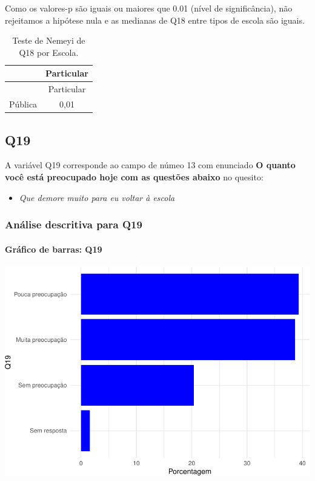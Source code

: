 \documentclass[]{article}
\providecommand{\tightlist}{%
  \setlength{\itemsep}{0pt}\setlength{\parskip}{0pt}}
\let\oldparagraph\paragraph
\renewcommand{\paragraph}[1]{\oldparagraph{#1}\mbox{}}
\begin{document}
Como os valores-p são iguais ou maiores que 0.01 (nível de significância), não rejeitamos a hipótese nula e as medianas de Q18 entre tipos de escola são iguais.

\begin{longtable}[]{@{}lc@{}}
\caption{\label{tab:unnamed-chunk-297}Teste de Nemeyi de Q18 por Escola.}\tabularnewline
\toprule
& Particular\tabularnewline
\midrule
\endfirsthead
\toprule
& Particular\tabularnewline
\midrule
\endhead
Pública & 0,01\tabularnewline
\bottomrule
\end{longtable}

\cleardoublepage

\hypertarget{q19}{%
\subsection{Q19}\label{q19}}

A variável Q19 corresponde ao campo de númeo 13 com enunciado \textbf{O quanto você está preocupado hoje com as questões abaixo} no quesito:

\begin{itemize}
\tightlist
\item
  \emph{Que demore muito para eu voltar à escola}
\end{itemize}

\hypertarget{anuxe1lise-descritiva-para-q19}{%
\subsubsection{Análise descritiva para Q19}\label{anuxe1lise-descritiva-para-q19}}

\hypertarget{gruxe1fico-de-barras-q19}{%
\paragraph{Gráfico de barras: Q19}\label{gruxe1fico-de-barras-q19}}

\begin{center}\includegraphics[width=0.75\linewidth]{relatorio_covid19_files/figure-latex/unnamed-chunk-304-1} \end{center}
\end{document}
